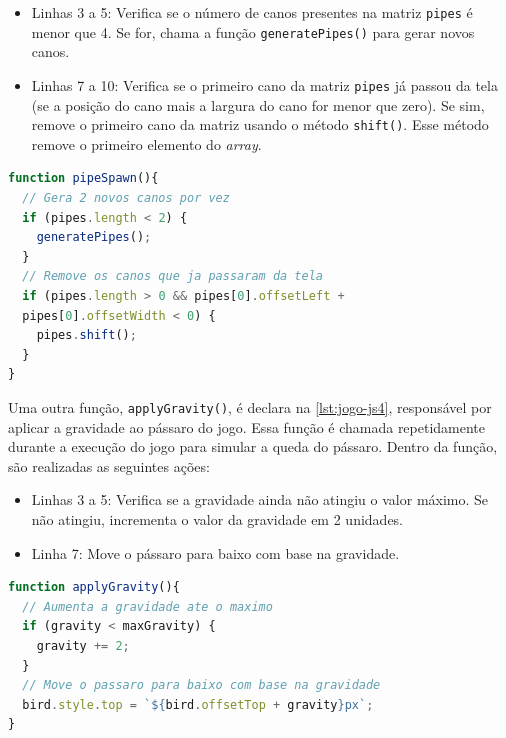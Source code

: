 \begin{itemize}
    \item Linhas 3 a 5: Verifica se o número de canos presentes na matriz \texttt{pipes} é menor que 4. Se for, chama a função \texttt{generatePipes()} para gerar novos canos.

    \item Linhas 7 a 10: Verifica se o primeiro cano da matriz \texttt{pipes} já passou da tela (se a posição do cano mais a largura do cano for menor que zero). Se sim, remove o primeiro cano da matriz usando o método \texttt{shift()}. Esse método remove o primeiro elemento do \textit{array}.
\end{itemize}


\newpage
\begin{lstlisting}[language=TypeScript, caption={Projeto exemplo em JS (Parte 3): Função de surgimento de canos}, label=lst:jogo-js3]
function pipeSpawn(){
  // Gera 2 novos canos por vez
  if (pipes.length < 2) {
    generatePipes();
  }
  // Remove os canos que ja passaram da tela
  if (pipes.length > 0 && pipes[0].offsetLeft + 
  pipes[0].offsetWidth < 0) {
    pipes.shift();
  }
}
\end{lstlisting}

Uma outra função, \texttt{applyGravity()}, é declara na \autoref{lst:jogo-js4}, responsável por aplicar a gravidade ao pássaro do jogo. Essa função é chamada repetidamente durante a execução do jogo para simular a queda do pássaro. Dentro da função, são realizadas as seguintes ações:
\begin{itemize}
    \item Linhas 3 a 5: Verifica se a gravidade ainda não atingiu o valor máximo. Se não atingiu, incrementa o valor da gravidade em 2 unidades.

    \item Linha 7: Move o pássaro para baixo com base na gravidade.
\end{itemize}



\begin{lstlisting}[language=TypeScript, caption={Projeto exemplo em JS (Parte 4): Função de aplicação da gravidade}, label=lst:jogo-js4]
function applyGravity(){
  // Aumenta a gravidade ate o maximo
  if (gravity < maxGravity) {
    gravity += 2;
  }
  // Move o passaro para baixo com base na gravidade
  bird.style.top = `${bird.offsetTop + gravity}px`;
}
\end{lstlisting}



